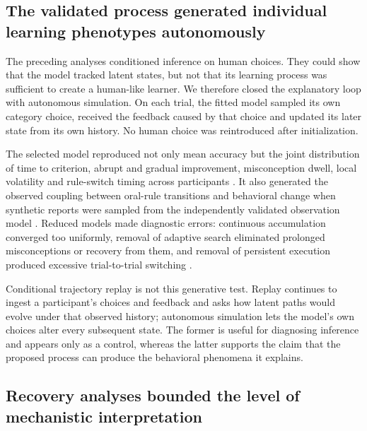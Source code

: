 \subsection{The validated process generated individual learning phenotypes autonomously}

The preceding analyses conditioned inference on human choices. They could show
that the model tracked latent states, but not that its learning process was
sufficient to create a human-like learner. We therefore closed the explanatory
loop with autonomous simulation. On each trial, the fitted model sampled its
own category choice, received the feedback caused by that choice and updated
its later state from its own history. No human choice was reintroduced after
initialization.

The selected model reproduced not only mean accuracy but the joint distribution
of time to criterion, abrupt and gradual improvement, misconception dwell,
local volatility and rule-switch timing across participants
. It also generated the observed coupling
between oral-rule transitions and behavioral change when synthetic reports were
sampled from the independently validated observation model
. Reduced models made
diagnostic errors: continuous accumulation converged too uniformly, removal of
adaptive search eliminated prolonged misconceptions or recovery from them, and
removal of persistent execution produced excessive trial-to-trial switching
.

Conditional trajectory replay is not this generative test. Replay continues to
ingest a participant's choices and feedback and asks how latent paths would
evolve under that observed history; autonomous simulation lets the model's own
choices alter every subsequent state. The former is useful for diagnosing
inference and appears only as a control, whereas the latter supports the claim
that the proposed process can produce the behavioral phenomena it explains.


\subsection{Recovery analyses bounded the level of mechanistic interpretation}

